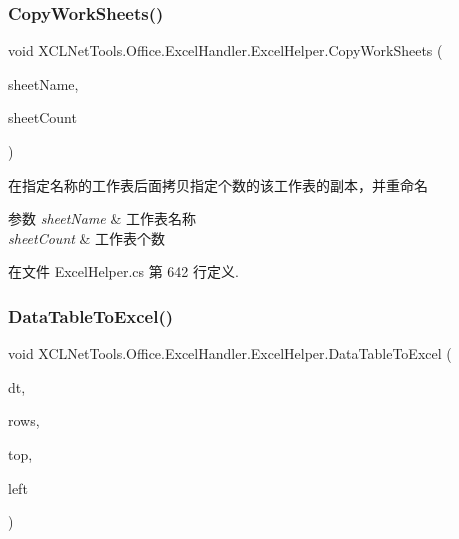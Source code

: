 \subsubsection{\texorpdfstring{Copy\+Work\+Sheets()}{CopyWorkSheets()}}
{\footnotesize\ttfamily void X\+C\+L\+Net\+Tools.\+Office.\+Excel\+Handler.\+Excel\+Helper.\+Copy\+Work\+Sheets (\begin{DoxyParamCaption}\item[{string}]{sheet\+Name,  }\item[{int}]{sheet\+Count }\end{DoxyParamCaption})}



在指定名称的工作表后面拷贝指定个数的该工作表的副本，并重命名 


\begin{DoxyParams}{参数}
{\em sheet\+Name} & 工作表名称\\
\hline
{\em sheet\+Count} & 工作表个数\\
\hline
\end{DoxyParams}


在文件 Excel\+Helper.\+cs 第 642 行定义.

\mbox{\label{class_x_c_l_net_tools_1_1_office_1_1_excel_handler_1_1_excel_helper_aff2b9ad2316d2acf6908da2929b5a103}} 
\subsubsection{\texorpdfstring{Data\+Table\+To\+Excel()}{DataTableToExcel()}\hspace{0.1cm}{\footnotesize\ttfamily [1/3]}}
{\footnotesize\ttfamily void X\+C\+L\+Net\+Tools.\+Office.\+Excel\+Handler.\+Excel\+Helper.\+Data\+Table\+To\+Excel (\begin{DoxyParamCaption}\item[{Data\+Table}]{dt,  }\item[{int}]{rows,  }\item[{int}]{top,  }\item[{int}]{left }\end{DoxyParamCaption})}



